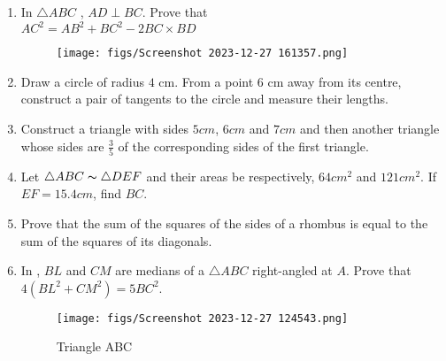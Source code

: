 \begin{enumerate}
\item In $\triangle ABC$ , $AD \perp BC$. Prove that\\
$AC^2 = AB^2 + BC^2 - 2BC \times BD $
\begin{figure}[H]
    \centering
    \texttt{[image: figs/Screenshot 2023-12-27 161357.png]}
    \caption{}
    \label{fig:Fig_2}
\end{figure}

\item Draw a circle of radius $4$ cm. From a point $6$ cm away from its centre, construct a pair of tangents to the circle and measure their lengths.

\item Construct a triangle with sides $5cm$, $6cm$ and $7cm$ and then another triangle whose sides are $\frac{3}{5}$ of the corresponding sides of the first triangle.

\item Let $\triangle ABC  \thicksim  \triangle DEF$  and their areas be respectively, $64cm^2$ and $121cm^2$. If $EF=15.4cm$, find $BC$.

\item Prove that the sum of the squares of the sides of a rhombus is equal to the sum of the squares of its diagonals. 

\item In , $BL$ and $CM$ are medians of a $\triangle ABC$ right-angled at $A$. Prove that $4(BL^2 + CM^2)= 5 BC^2$. 
\begin{figure}[H]
    \centering
    \texttt{[image: figs/Screenshot 2023-12-27 124543.png]}
    \caption{Triangle ABC}
    \label{fig:Fig_3}
\end{figure}
\end{enumerate}
